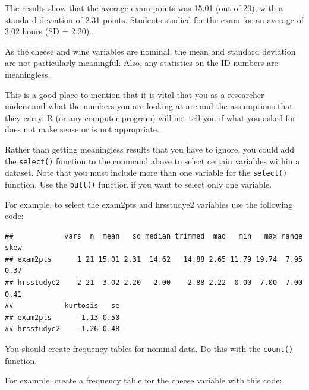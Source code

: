 \documentclass[
]{book}
\newenvironment{Shaded}{\begin{snugshade}}{\end{snugshade}}
\newcommand{\KeywordTok}[1]{\textcolor[rgb]{0.13,0.29,0.53}{\textbf{#1}}}
\newcommand{\NormalTok}[1]{#1}
\newcommand{\OperatorTok}[1]{\textcolor[rgb]{0.81,0.36,0.00}{\textbf{#1}}}
\newcommand{\StringTok}[1]{\textcolor[rgb]{0.31,0.60,0.02}{#1}}
\begin{document}
The results show that the average exam points was 15.01 (out of 20), with a standard deviation of 2.31 points. Students studied for the exam for an average of 3.02 hours (SD = 2.20).

As the cheese and wine variables are nominal, the mean and standard deviation are not particularly meaningful. Also, any statistics on the ID numbers are meaningless.

This is a good place to mention that it is vital that you as a researcher understand what the numbers you are looking at are and the assumptions that they carry. R (or any computer program) will not tell you if what you asked for does not make sense or is not appropriate.

Rather than getting meaningless results that you have to ignore, you could add the \texttt{select()} function to the command above to select certain variables within a dataset. Note that you must include more than one variable for the \texttt{select()} function. Use the \texttt{pull()} function if you want to select only one variable.

For example, to select the exam2pts and hrsstudye2 variables use the following code:

\begin{Shaded}
\end{Shaded}

\begin{verbatim}
##            vars  n  mean   sd median trimmed  mad   min   max range skew
## exam2pts      1 21 15.01 2.31  14.62   14.88 2.65 11.79 19.74  7.95 0.37
## hrsstudye2    2 21  3.02 2.20   2.00    2.88 2.22  0.00  7.00  7.00 0.41
##            kurtosis   se
## exam2pts      -1.13 0.50
## hrsstudye2    -1.26 0.48
\end{verbatim}

You should create frequency tables for nominal data. Do this with the \texttt{count()} function.

For example, create a frequency table for the cheese variable with this code:

\begin{Shaded}
\end{Shaded}
\end{document}
